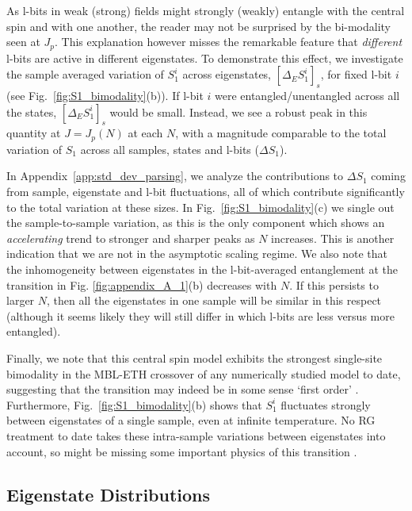 \documentclass[aps,pra,twocolumn,a4paper,showpacs,superscriptaddress,floatfix,10pt]{revtex4}
\begin{document}
As l-bits in weak (strong) fields might strongly (weakly) entangle with the central spin and with one another, the reader may not be surprised by the bi-modality seen at $J_p$.
This explanation however misses the remarkable feature that \emph{different} l-bits are active in different eigenstates.
To demonstrate this effect, we investigate the sample averaged variation of $S_1^i$ across eigenstates, $\left[\Delta_E S_1^{i}\right]_{s}$, for fixed l-bit $i$ (see Fig.~\ref{fig:S1_bimodality}(b)).
If l-bit $i$ were entangled/unentangled across all the states, $\left[\Delta_E S_1^{i}\right]_{s}$ would be small.
Instead, we see a robust peak in this quantity at $J=J_p(N)$ at each $N$, with a magnitude comparable to the total variation of $S_1$ across all samples, states and l-bits ($\Delta S_1$).

In Appendix~\ref{app:std_dev_parsing}, we analyze the contributions to $\Delta S_1$ coming from sample, eigenstate and l-bit fluctuations, all of which contribute significantly to the total variation at these sizes.
In Fig.~\ref{fig:S1_bimodality}(c) we single out the sample-to-sample variation, as this is the only component which shows an {\it accelerating} trend to stronger and sharper peaks as $N$ increases.
This is another indication that we are not in the asymptotic scaling regime.
We also note that the inhomogeneity between eigenstates in the l-bit-averaged entanglement at the transition in Fig. \ref{fig:appendix_A_1}(b) decreases with $N$.
If this persists to larger $N$, then all the eigenstates in one sample will be similar in this respect (although it seems likely they will still differ in which l-bits are less versus more entangled).

Finally, we note that this central spin model exhibits the strongest single-site bimodality in the MBL-ETH crossover of any numerically studied model to date, suggesting that the transition may indeed be in some sense `first order' \cite{Yu:2016aa}.
%
Furthermore, Fig.~\ref{fig:S1_bimodality}(b) shows that $S_1^i$ fluctuates strongly between eigenstates of a single sample, even at infinite temperature.
No RG treatment to date takes these intra-sample variations between eigenstates into account, so might be missing some important physics of this transition \cite{Vosk:2015aa,Potter:2015ab}.



\subsection{Eigenstate Distributions} %
\label{sub:eigenstate_distributions}
\end{document}
